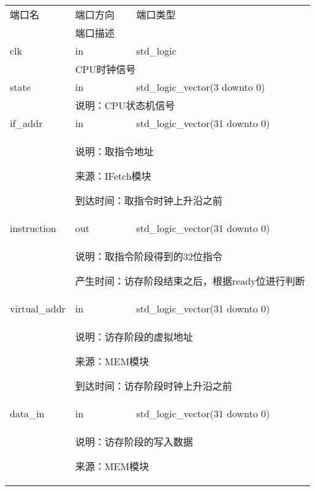         \begin{tabularx}{\textwidth}{lll}
            \toprule
            端口名          & 端口方向  & 端口类型 \\
            \cmidrule(l){2-3}
            &
            \multicolumn{2}{X}{端口描述} \\
            \midrule
            clk             & in        & std\_logic \\
            \cmidrule(l){2-3}
            &
            \multicolumn{2}{X}{
                CPU时钟信号
            } \\
            \midrule
            state           & in        & std\_logic\_vector(3 downto 0) \\
            \cmidrule(l){2-3}
            &
            \multicolumn{2}{X}{
                说明：CPU状态机信号
            } \\
            \midrule
            if\_addr        & in        & std\_logic\_vector(31 downto 0) \\
            \cmidrule(l){2-3}
            &
            \multicolumn{2}{X}{
                说明：取指令地址

                来源：IFetch模块

                到达时间：取指令时钟上升沿之前
            } \\
            \midrule
            instruction        & out        & std\_logic\_vector(31 downto 0) \\
            \cmidrule(l){2-3}
            &
            \multicolumn{2}{X}{
                说明：取指令阶段得到的32位指令

                产生时间：访存阶段结束之后，根据ready位进行判断
            } \\
            \midrule
            virtual\_addr & in      & std\_logic\_vector(31 downto 0) \\
            \cmidrule(l){2-3}
            &
            \multicolumn{2}{X}{
                说明：访存阶段的虚拟地址

                来源：MEM模块

                到达时间：访存阶段时钟上升沿之前
            } \\
            \midrule
            data\_in & in     & std\_logic\_vector(31 downto 0) \\
            \cmidrule(l){2-3}
            &
            \multicolumn{2}{X}{
                说明：访存阶段的写入数据

                来源：MEM模块

}
\end{tabularx}
